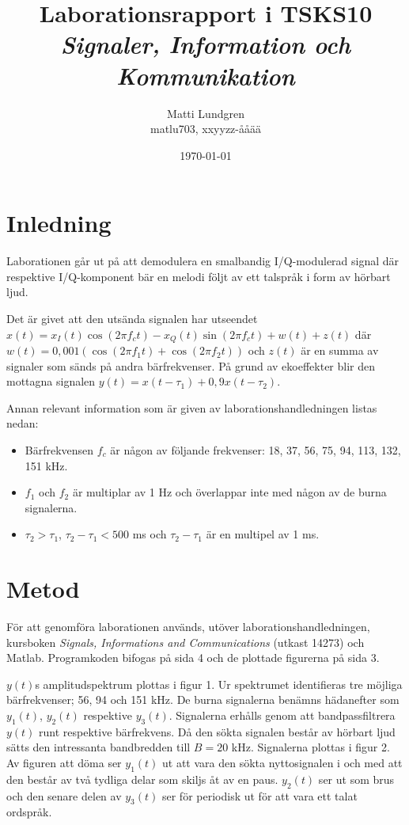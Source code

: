 \documentclass[10pt,twocolumn]{article}
\title{Laborationsrapport i TSKS10 \emph{Signaler, Information och Kommunikation}}
\author{Matti Lundgren \\ matlu703, xxyyzz-ååää }
\date{\today}
\begin{document}
\maketitle

\clearpage

\section{Inledning}

Laborationen går ut på att demodulera en smalbandig I/Q-modulerad signal där respektive I/Q-komponent bär en melodi följt av ett talspråk i form av hörbart ljud. 

Det är givet att den utsända signalen har utseendet $x(t)=x_I(t)\cos(2\pi f_ct)-x_Q(t)\sin(2\pi f_ct)+w(t)+z(t)$ där $w(t) = 0{,}001(\cos(2\pi f_1t) + \cos(2\pi f_2t))$ och $z(t)$ är en summa av signaler som sänds på andra bärfrekvenser. På grund av ekoeffekter blir den mottagna signalen $y(t)=x(t-\tau_1)+0{,}9x(t-\tau_2)$.

Annan relevant information som är given av laborationshandledningen listas nedan:
\begin{itemize}
\item Bärfrekvensen $f_c$ är någon av följande frekvenser: 18, 37, 56, 75, 94, 113, 132, 151 kHz.
\item $f_1$ och $f_2$ är multiplar av 1 Hz och överlappar inte med någon av de burna signalerna.
\item $\tau_2>\tau_1$, $\tau_2-\tau_1<500$ ms och $\tau_2-\tau_1$ är en multipel av 1 ms.
\end{itemize}

\section{Metod}



För att genomföra laborationen används, utöver laborationshandledningen, kursboken \textit{Signals, Informations and Communications} (utkast 14273) och Matlab. \linebreak Programkoden bifogas på sida 4 och de plottade figurerna på sida 3.

$y(t)$s amplitudspektrum plottas i figur 1. Ur spektrumet identifieras tre möjliga bärfrekvenser; 56, 94 och 151 kHz. De burna signalerna benämns hädanefter som $y_1(t)$, $y_2(t)$ respektive $y_3(t)$. Signalerna erhålls genom att bandpassfiltrera $y(t)$ runt respektive bärfrekvens. Då den sökta signalen består av hörbart ljud sätts den intressanta bandbredden till $B=20$ kHz. Signalerna plottas i figur 2. Av figuren att döma ser $y_1(t)$ ut att vara den sökta nyttosignalen i och med att den består av två tydliga delar som skiljs åt av en paus. $y_2(t)$ ser ut som brus och den senare delen av $y_3(t)$ ser för periodisk ut för att vara ett talat ordspråk.
\end{document}
